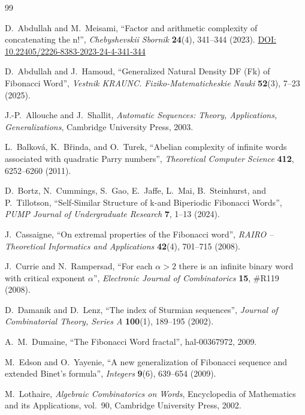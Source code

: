 \documentclass[12pt]{amsart}
\theoremstyle{plain}
\theoremstyle{definition}
\theoremstyle{remark}
\newcommand{\doi}[1]{\href{https://doi.org/#1}{DOI: #1}}
\begin{document}

\begin{thebibliography}{99}

D.~Abdullah and M.~Meisami,
``Factor and arithmetic complexity of concatenating the n!'',
\emph{Chebyshevskii Sbornik} \textbf{24}(4), 341--344 (2023).
\doi{10.22405/2226-8383-2023-24-4-341-344}

D.~Abdullah and J.~Hamoud,
``Generalized Natural Density DF (Fk) of Fibonacci Word'',
\emph{Vestnik KRAUNC. Fiziko-Matematicheskie Nauki} \textbf{52}(3), 7--23 (2025).

J.-P.~Allouche and J.~Shallit,
\emph{Automatic Sequences: Theory, Applications, Generalizations},
Cambridge University Press, 2003.

L.~Balkov\'a, K.~B\v{r}inda, and O.~Turek,
``Abelian complexity of infinite words associated with quadratic Parry numbers'',
\emph{Theoretical Computer Science} \textbf{412}, 6252--6260 (2011).

D.~Bortz, N.~Cummings, S.~Gao, E.~Jaffe, L.~Mai, B.~Steinhurst, and P.~Tillotson,
``Self-Similar Structure of k-and Biperiodic Fibonacci Words'',
\emph{PUMP Journal of Undergraduate Research} \textbf{7}, 1--13 (2024).

J.~Cassaigne,
``On extremal properties of the Fibonacci word'',
\emph{RAIRO -- Theoretical Informatics and Applications} \textbf{42}(4), 701--715 (2008).

J.~Currie and N.~Rampersad,
``For each $\alpha>2$ there is an infinite binary word with critical exponent $\alpha$'',
\emph{Electronic Journal of Combinatorics} \textbf{15}, \#R119 (2008).

D.~Damanik and D.~Lenz,
``The index of Sturmian sequences'',
\emph{Journal of Combinatorial Theory, Series A} \textbf{100}(1), 189--195 (2002).

A.~M.~Dumaine,
``The Fibonacci Word fractal'', hal-00367972, 2009.

M.~Edson and O.~Yayenie,
``A new generalization of Fibonacci sequence and extended Binet's formula'',
\emph{Integers} \textbf{9}(6), 639--654 (2009).

M.~Lothaire,
\emph{Algebraic Combinatorics on Words},
Encyclopedia of Mathematics and its Applications, vol.~90,
Cambridge University Press, 2002.


\end{thebibliography}
\end{document}
